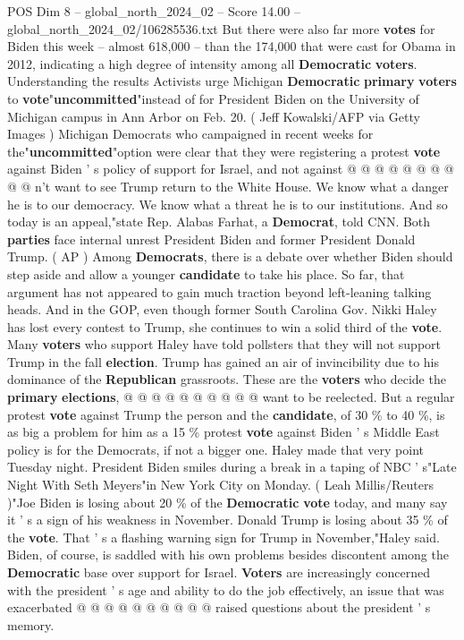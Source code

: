 \begin{textsample}{POS Dim 8 – global\_north\_2024\_02 – Score 14.00 – global\_north\_2024\_02/106285536.txt}
But there were also far more \textbf{votes} for Biden this week -- almost 618,000 -- than the 174,000 that were cast for Obama in 2012, indicating a high degree of intensity among all \textbf{Democratic} \textbf{voters}.
Understanding the results Activists urge Michigan \textbf{Democratic} \textbf{primary} \textbf{voters} to \textbf{vote}"\textbf{uncommitted}"instead of for President Biden on the University of Michigan campus in Ann Arbor on Feb. 20. ( Jeff Kowalski/AFP via Getty Images ) Michigan Democrats who campaigned in recent weeks for the"\textbf{uncommitted}"option were clear that they were registering a protest \textbf{vote} against Biden ' s policy of support for Israel, and not against @ @ @ @ @ @ @ @ @ @ n't want to see Trump return to the White House.
We know what a danger he is to our democracy.
We know what a threat he is to our institutions.
And so today is an appeal,"state Rep.
Alabas Farhat, a \textbf{Democrat}, told CNN.
Both \textbf{parties} face internal unrest President Biden and former President Donald Trump. ( AP ) Among \textbf{Democrats}, there is a debate over whether Biden should step aside and allow a younger \textbf{candidate} to take his place.
So far, that argument has not appeared to gain much traction beyond left-leaning talking heads.
And in the GOP, even though former South Carolina Gov.
Nikki Haley has lost every contest to Trump, she continues to win a solid third of the \textbf{vote}.
Many \textbf{voters} who support Haley have told pollsters that they will not support Trump in the fall \textbf{election}.
Trump has gained an air of invincibility due to his dominance of the \textbf{Republican} grassroots.
These are the \textbf{voters} who decide the \textbf{primary} \textbf{elections}, @ @ @ @ @ @ @ @ @ @ want to be reelected.
But a regular protest \textbf{vote} against Trump the person and the \textbf{candidate}, of 30 \% to 40 \%, is as big a problem for him as a 15 \% protest \textbf{vote} against Biden ' s Middle East policy is for the Democrats, if not a bigger one.
Haley made that very point Tuesday night.
President Biden smiles during a break in a taping of NBC ' s"Late Night With Seth Meyers"in New York City on Monday. ( Leah Millis/Reuters )"Joe Biden is losing about 20 \% of the \textbf{Democratic} \textbf{vote} today, and many say it ' s a sign of his weakness in November.
Donald Trump is losing about 35 \% of the \textbf{vote}.
That ' s a flashing warning sign for Trump in November,"Haley said.
Biden, of course, is saddled with his own problems besides discontent among the \textbf{Democratic} base over support for Israel. \textbf{Voters} are increasingly concerned with the president ' s age and ability to do the job effectively, an issue that was exacerbated @ @ @ @ @ @ @ @ @ @ raised questions about the president ' s memory.

\end{textsample}
